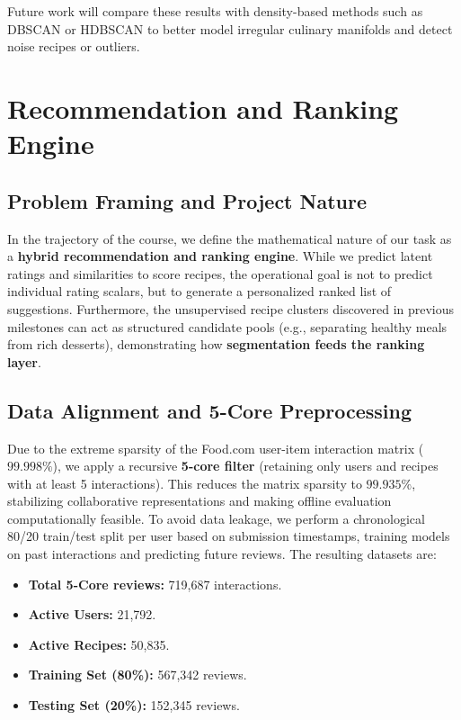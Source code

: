 \documentclass[11pt,a4paper]{article}
\begin{document}
Future work will compare these results with density-based methods such as DBSCAN or HDBSCAN to better model irregular culinary manifolds and detect noise recipes or outliers.

\section{Recommendation and Ranking Engine}

\subsection{Problem Framing and Project Nature}
In the trajectory of the course, we define the mathematical nature of our task as a \textbf{hybrid recommendation and ranking engine}. 
While we predict latent ratings and similarities to score recipes, the operational goal is not to predict individual rating scalars, but to generate a personalized ranked list of suggestions.
Furthermore, the unsupervised recipe clusters discovered in previous milestones can act as structured candidate pools (e.g., separating healthy meals from rich desserts), demonstrating how \textbf{segmentation feeds the ranking layer}. 

\subsection{Data Alignment and 5-Core Preprocessing}
Due to the extreme sparsity of the Food.com user-item interaction matrix ($99.998\%$), we apply a recursive \textbf{5-core filter} (retaining only users and recipes with at least 5 interactions). This reduces the matrix sparsity to $99.935\%$, stabilizing collaborative representations and making offline evaluation computationally feasible. 
To avoid data leakage, we perform a chronological 80/20 train/test split per user based on submission timestamps, training models on past interactions and predicting future reviews.
The resulting datasets are:
\begin{itemize}
    \item \textbf{Total 5-Core reviews:} 719,687 interactions.
    \item \textbf{Active Users:} 21,792.
    \item \textbf{Active Recipes:} 50,835.
    \item \textbf{Training Set (80\%):} 567,342 reviews.
    \item \textbf{Testing Set (20\%):} 152,345 reviews.
\end{itemize}
\end{document}
